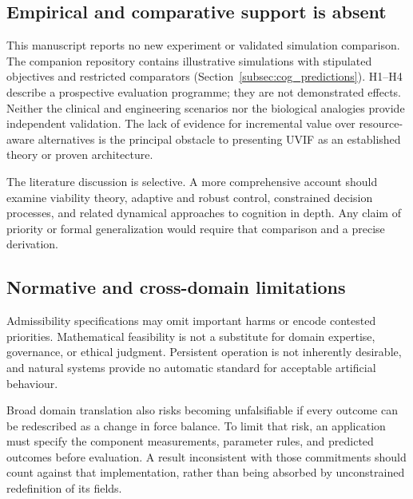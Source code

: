 \subsection{Empirical and comparative support is absent}
This manuscript reports no new experiment or validated simulation comparison. The companion repository contains illustrative simulations with stipulated objectives and restricted comparators (Section~\ref{subsec:cog_predictions}). H1--H4 describe a prospective evaluation programme; they are not demonstrated effects. Neither the clinical and engineering scenarios nor the biological analogies provide independent validation. The lack of evidence for incremental value over resource-aware alternatives is the principal obstacle to presenting UVIF as an established theory or proven architecture.

The literature discussion is selective. A more comprehensive account should examine viability theory, adaptive and robust control, constrained decision processes, and related dynamical approaches to cognition in depth. Any claim of priority or formal generalization would require that comparison and a precise derivation.

\subsection{Normative and cross-domain limitations}
Admissibility specifications may omit important harms or encode contested priorities. Mathematical feasibility is not a substitute for domain expertise, governance, or ethical judgment. Persistent operation is not inherently desirable, and natural systems provide no automatic standard for acceptable artificial behaviour.

Broad domain translation also risks becoming unfalsifiable if every outcome can be redescribed as a change in force balance. To limit that risk, an application must specify the component measurements, parameter rules, and predicted outcomes before evaluation. A result inconsistent with those commitments should count against that implementation, rather than being absorbed by unconstrained redefinition of its fields.
